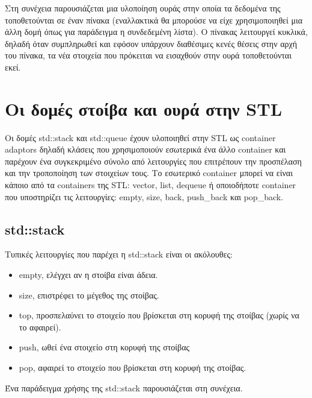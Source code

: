 Στη συνέχεια παρουσιάζεται μια υλοποίηση ουράς στην οποία τα δεδομένα της τοποθετούνται σε έναν πίνακα (εναλλακτικά θα μπορούσε να είχε χρησιμοποιηθεί μια άλλη δομή όπως για παράδειγμα η συνδεδεμένη λίστα). Ο πίνακας λειτουργεί κυκλικά, δηλαδή όταν συμπληρωθεί και εφόσον υπάρχουν διαθέσιμες κενές θέσεις στην αρχή του πίνακα, τα νέα στοιχεία που πρόκειται να εισαχθούν στην ουρά τοποθετούνται εκεί.





\section{Οι δομές στοίβα και ουρά στην STL}
Οι δομές std::stack και std::queue έχουν υλοποιηθεί στην STL ως container adaptors δηλαδή κλάσεις που χρησιμοποιούν εσωτερικά ένα άλλο container και παρέχουν ένα συγκεκριμένο σύνολο από λειτουργίες που επιτρέπουν την προσπέλαση και την τροποποίηση των στοιχείων τους. Το εσωτερικό container μπορεί να είναι κάποιο από τα containers της STL: vector, list, dequeue ή οποιοδήποτε container που υποστηρίζει τις λειτουργίες: empty, size, back, push\_back και pop\_back.
\subsection{std::stack}
Τυπικές λειτουργίες που παρέχει η std::stack είναι οι ακόλουθες:
\begin{itemize}[noitemsep]
\item empty, ελέγχει αν η στοίβα είναι άδεια.
\item size, επιστρέφει το μέγεθος της στοίβας.
\item top, προσπελαύνει το στοιχείο που βρίσκεται στη κορυφή της στοίβας (χωρίς να το αφαιρεί).
\item push, ωθεί ένα στοιχείο στη κορυφή της στοίβας
\item pop, αφαιρεί το στοιχείο που βρίσκεται στη κορυφή της στοίβας.
\end{itemize}

Ένα παράδειγμα χρήσης της std::stack παρουσιάζεται στη συνέχεια.



